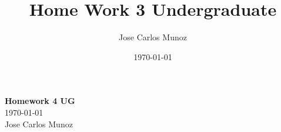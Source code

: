 \documentclass[12pt,english]{article}
\title{Home Work 3 Undergraduate}
\date{\today}
\author{Jose Carlos Munoz}
\begin{document}
\begin{center}
    \Large
    \textbf{Homework 4 UG}\\
    \small
    \today\\
    \large
    Jose Carlos Munoz
\end{center}%
\end{document}
